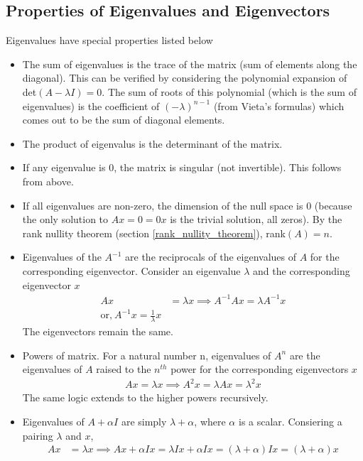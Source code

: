 \documentclass[../../linear_algebra.tex]{subfiles}
\begin{document}
\subsection{Properties of Eigenvalues and Eigenvectors}
Eigenvalues have special properties listed below
\begin{itemize}
    \item The sum of eigenvalues is the trace of the matrix (sum of elements along the diagonal).\newline
    This can be verified by considering the polynomial expansion of det$(A - \lambda I) = 0$. The sum of roots of this polynomial (which is the sum of eigenvalues) is the coefficient of $(-\lambda)^{n-1}$ (from Vieta's formulas) which comes out to be the sum of diagonal elements.
    \item The product of eigenvalus is the determinant of the matrix.
    \item If any eigenvalue is $0$, the matrix is singular (not invertible). This follows from above.
    \item If all eigenvalues are non-zero, the dimension of the null space is $0$ (because the only solution to $Ax = 0 = 0x$ is the trivial solution, all zeros). By the rank nullity theorem (section \ref{rank_nullity_theorem}), rank$(A) = n$.
    \item Eigenvalues of the $A^{-1}$ are the reciprocals of the eigenvalues of $A$ for the corresponding eigenvector. Consider an eigenvalue $\lambda$ and the corresponding eigenvector $x$
    \begin{align*}
         Ax &= \lambda x \implies A^{-1}Ax = \lambda A^{-1}x\\
         \text{or,} \: A^{-1}x = \frac{1}{\lambda}x
    \end{align*}
    The eigenvectors remain the same.
    \item Powers of matrix. For a natural number n, eigenvalues of $A^{n}$ are the eigenvalues of $A$ raised to the $n^{th}$ power for the corresponding eigenvectors $x$\begin{align*}
        Ax = \lambda x \implies A^{2}x = \lambda Ax = \lambda^{2}x
    \end{align*}
    The same logic extends to the higher powers recursively.
    \item Eigenvalues of $A + \alpha I$ are simply $\lambda + \alpha$, where $\alpha$ is a scalar. Consiering a pairing $\lambda$ and $x$,
    \begin{align*}
        Ax &= \lambda x \implies Ax + \alpha Ix = \lambda Ix + \alpha Ix = (\lambda + \alpha)Ix = (\lambda + \alpha)x\\

\end{align*}
\end{itemize}
\end{document}
